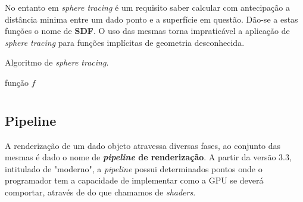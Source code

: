No entanto em \textit{sphere tracing} é um requisito saber calcular com antecipação a distância minima entre um dado ponto e a superfície em questão. Dão-se a estas funções o nome de \textbf{\ac{SDF}}. O uso das mesmas torna impraticável a aplicação de \textit{sphere tracing} para funções implícitas de geometria desconhecida.


\begin{algorithm}[!htbp]
	\caption{Algoritmo de \textit{sphere tracing}.}
	\label{alg::raymarch_spheretrace}
	\begin{algorithmic}
\Require função $f$      
	\end{algorithmic}
\end{algorithm}


\section{\opengl}
\label{sec::arte:opengl}



\subsection{Pipeline}
A renderização de um dado objeto atravessa diversas fases, ao conjunto das mesmas é dado o nome de \textbf{\textit{pipeline} de renderização}. A partir da versão 3.3, intitulado de "\opengl moderno", a \textit{pipeline} possui determinados pontos onde o programador tem a capacidade de implementar como a \ac{GPU} se deverá comportar, através de do que chamamos de \textit{shaders}.

